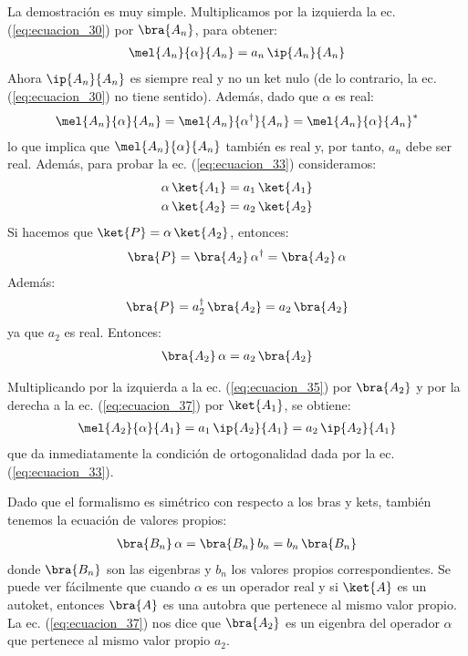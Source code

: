 La demostración es muy simple. Multiplicamos por la izquierda la ec. (\ref{eq:ecuacion_30}) por $\bra{A_{n}}$, para obtener:
\begin{align*}
\mel{A_{n}}{\alpha}{A_{n}} = a_{n} \, \ip{A_{n}}{A_{n}}
\end{align*}
Ahora $\ip{A_{n}}{A_{n}}$ es siempre real y no un ket nulo (de lo contrario, la ec. (\ref{eq:ecuacion_30}) no tiene
sentido). Además, dado que $\alpha$ es real:
\begin{align*}
\mel{A_{n}}{\alpha}{A_{n}} = \mel{A_{n}}{\alpha^{\dagger}}{A_{n}} = \mel{A_{n}}{\alpha}{A_{n}}^{*}
\end{align*}
lo que implica que $\mel{A_{n}}{\alpha}{A_{n}}$ también es real y, por tanto, $a_{n}$ debe ser real. Además, para probar la ec. (\ref{eq:ecuacion_33}) consideramos:
\begin{align}
\alpha \, \ket{A_{1}} &= a_{1} \, \ket{A_{1}} \label{eq:ecuacion_35} \\
\alpha \, \ket{A_{2}} &= a_{2} \, \ket{A_{2}} \label{eq:ecuacion_36}
\end{align}
Si hacemos que $\ket{P} = \alpha \, \ket{A_{2}}$, entonces:
\begin{align*}
\bra{P} = \bra{A_{2}} \, \alpha^{\dagger} = \bra{A_{2}} \, \alpha
\end{align*}
Además:
\begin{align*}
\bra{P} = a_{2}^{\dagger} \, \bra{A_{2}} = a_{2} \, \bra{A_{2}}
\end{align*}
ya que $a_{2}$ es real. Entonces:
\begin{align}
\bra{A_{2}} \, \alpha = a_{2} \, \bra{A_{2}}
\label{eq:ecuacion_37}
\end{align}

Multiplicando por la izquierda a la ec. (\ref{eq:ecuacion_35}) por $\bra{A_{2}}$ y por la derecha a la ec. (\ref{eq:ecuacion_37}) por $\ket{A_{1}}$, se obtiene:
\begin{align*}
\mel{A_{2}}{\alpha}{A_{1}} = a_{1} \, \ip{A_{2}}{A_{1}} = a_{2} \, \ip{A_{2}}{A_{1}}
\end{align*}
que da inmediatamente la condición de ortogonalidad dada por la ec. (\ref{eq:ecuacion_33}).
\par
Dado que el formalismo es simétrico con respecto a los bras y kets, también tenemos la ecuación de valores propios:
\begin{align}
\bra{B_{n}} \, \alpha = \bra{B_{n}} \, b_{n} = b_{n} \, \bra{B_{n}}
\end{align}
donde $\bra{B_{n}}$ son las eigenbras y $b_{n}$ los valores propios correspondientes. Se puede ver fácilmente que cuando $\alpha$ es un operador real y si $\ket{A}$ es un autoket, entonces $\bra{A}$ es una autobra que pertenece al mismo valor propio. La ec. (\ref{eq:ecuacion_37}) nos dice que $\bra{A_{2}}$ es un eigenbra del operador $\alpha$ que pertenece al mismo valor propio $a_{2}$.

